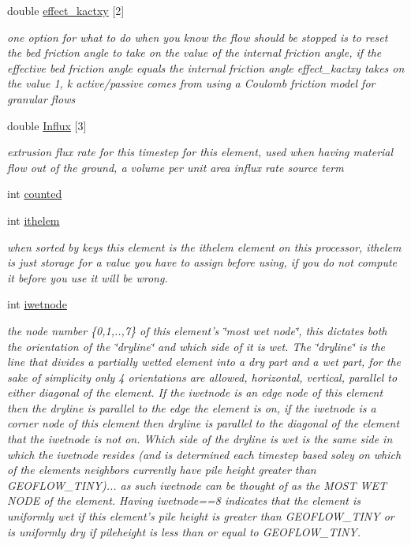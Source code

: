 \begin{CompactItemize}
double \hyperlink{classElement_r46}{effect\_\-kactxy} \mbox{[}2\mbox{]}
\begin{CompactList}\small\item\em one option for what to do when you know the flow should be stopped is to reset the bed friction angle to take on the value of the internal friction angle, if the effective bed friction angle equals the internal friction angle effect\_\-kactxy takes on the value 1, k active/passive comes from using a Coulomb friction model for granular flows \item\end{CompactList}\item 
double \hyperlink{classElement_r47}{Influx} \mbox{[}3\mbox{]}
\begin{CompactList}\small\item\em extrusion flux rate for this timestep for this element, used when having material flow out of the ground, a volume per unit area influx rate source term \item\end{CompactList}\item 
int \hyperlink{classElement_r48}{counted}
\item 
int \hyperlink{classElement_r49}{ithelem}
\begin{CompactList}\small\item\em when sorted by keys this element is the ithelem element on this processor, ithelem is just storage for a value you have to assign before using, if you do not compute it before you use it will be wrong. \item\end{CompactList}\item 
int \hyperlink{classElement_r50}{iwetnode}
\begin{CompactList}\small\item\em the node number \{0,1,..,7\} of this element's \char`\"{}most wet node\char`\"{}, this dictates both the orientation of the \char`\"{}dryline\char`\"{} and which side of it is wet. The \char`\"{}dryline\char`\"{} is the line that divides a partially wetted element into a dry part and a wet part, for the sake of simplicity only 4 orientations are allowed, horizontal, vertical, parallel to either diagonal of the element. If the iwetnode is an edge node of this element then the dryline is parallel to the edge the element is on, if the iwetnode is a corner node of this element then dryline is parallel to the diagonal of the element that the iwetnode is not on. Which side of the dryline is wet is the same side in which the iwetnode resides (and is determined each timestep based soley on which of the elements neighbors currently have pile height greater than GEOFLOW\_\-TINY)... as such iwetnode can be thought of as the MOST WET NODE of the element. Having iwetnode==8 indicates that the element is uniformly wet if this element's pile height is greater than GEOFLOW\_\-TINY or is uniformly dry if pileheight is less than or equal to GEOFLOW\_\-TINY. \item\end{CompactList}\item 

\end{CompactItemize}
